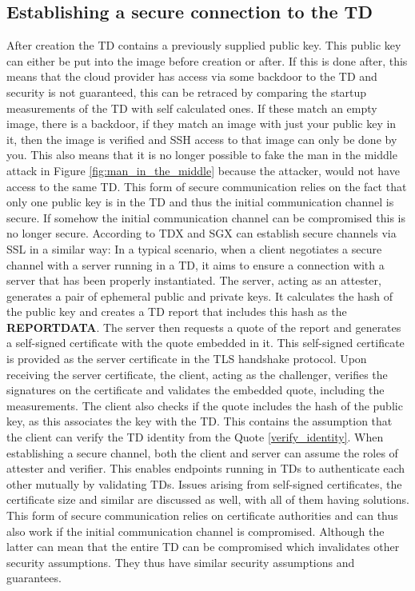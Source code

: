 \subsection{Establishing a secure connection to the TD}
\label{Establishing_a_secure_connection}
After creation the TD contains a previously supplied public key. This public key can either be put into the image before creation or after. If this is done after, this means that the cloud provider has access via some backdoor to the TD and security is not guaranteed, this can be retraced by comparing the startup measurements of the TD with self calculated ones. If these match an empty image, there is a backdoor, if they match an image with just your public key in it, then the image is verified and SSH access to that image can only be done by you. This also means that it is no longer possible to fake the man in the middle attack in Figure \ref{fig:man_in_the_middle} because the attacker, would not have access to the same TD. This form of secure communication relies on the fact that only one public key is in the TD and thus the initial communication channel is secure. If somehow the initial communication channel can be compromised this is no longer secure.
According to \cite{cheng_intel_2023} TDX and SGX can establish secure channels via SSL in a similar way:
In a typical scenario, when a client negotiates a secure channel with a server running in a TD, it aims to ensure a connection with a server that has been properly instantiated. The server, acting as an attester, generates a pair of ephemeral public and private keys. It calculates the hash of the public key and creates a TD report that includes this hash as the \textbf{REPORTDATA}. The server then requests a quote of the report and generates a self-signed certificate with the quote embedded in it. This self-signed certificate is provided as the server certificate in the TLS handshake protocol. Upon receiving the server certificate, the client, acting as the challenger, verifies the signatures on the certificate and validates the embedded quote, including the measurements. The client also checks if the quote includes the hash of the public key, as this associates the key with the TD. This contains the assumption that the client can verify the TD identity from the Quote \ref{verify_identity}. When establishing a secure channel, both the client and server can assume the roles of attester and verifier. This enables endpoints running in TDs to authenticate each other mutually by validating TDs\cite{knauth_integrating_2019}. Issues arising from self-signed certificates, the certificate size and similar are discussed as well, with all of them  having solutions. This form of secure communication relies on certificate authorities and can thus also work if the initial communication channel is compromised. Although the latter can mean that the entire TD can be compromised which invalidates other security assumptions. They thus have similar security assumptions and guarantees.

